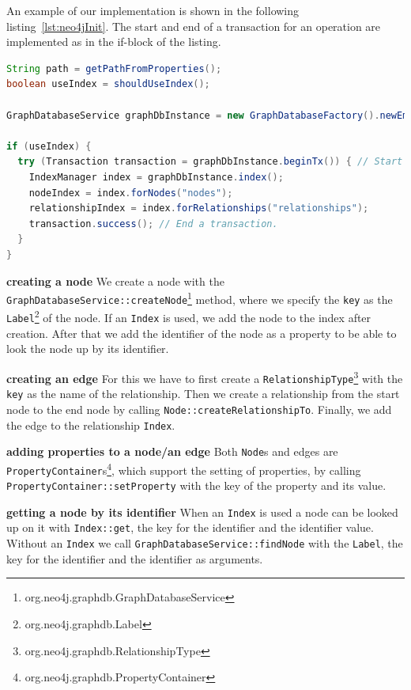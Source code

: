 An example of our implementation is shown in the following listing~\ref{lst:neo4jInit}.
The start and end of a transaction for an operation are implemented as in the if-block of the listing.

\pagebreak

\begin{lstlisting}[language=Java,label={lst:neo4jInit},caption={Implementation of the initialisation and beginning of a transaction.},captionpos=b]
String path = getPathFromProperties();
boolean useIndex = shouldUseIndex();

GraphDatabaseService graphDbInstance = new GraphDatabaseFactory().newEmbeddedDatabase(new File(path)); // Creates to object to access the database.

if (useIndex) {
  try (Transaction transaction = graphDbInstance.beginTx()) { // Start a transaction.
    IndexManager index = graphDbInstance.index();
    nodeIndex = index.forNodes("nodes");
    relationshipIndex = index.forRelationships("relationships");
    transaction.success(); // End a transaction.
  }
}
\end{lstlisting}

\textbf{creating a node} \newline
We create a node with the \texttt{GraphDatabaseService::createNode}\footnote{org.neo4j.graphdb.GraphDatabaseService} method,
where we specify the \texttt{key} as the \texttt{Label}\footnote{org.neo4j.graphdb.Label} of the node.
If an \texttt{Index} is used,
we add the node to the index after creation.
After that we add the identifier of the node as a property to be able to look the node up by its identifier.

\textbf{creating an edge} \newline
For this we have to first create a \texttt{RelationshipType}\footnote{org.neo4j.graphdb.RelationshipType} with the \texttt{key} as the name of the relationship.
Then we create a relationship from the start node to the end node by calling \texttt{Node::createRelationshipTo}.
Finally,
we add the edge to the relationship \texttt{Index}.

\textbf{adding properties to a node/an edge} \newline
Both \texttt{Node}s and edges are \texttt{PropertyContainer}s\footnote{org.neo4j.graphdb.PropertyContainer},
which support the setting of properties,
by calling \texttt{PropertyContainer::setProperty} with the key of the property and its value.

\textbf{getting a node by its identifier} \newline
When an \texttt{Index} is used a node can be looked up on it with \texttt{Index::get},
the key for the identifier and the identifier value.
Without an \texttt{Index} we call \texttt{GraphDatabaseService::findNode} with the \texttt{Label},
the key for the identifier and the identifier as arguments.

